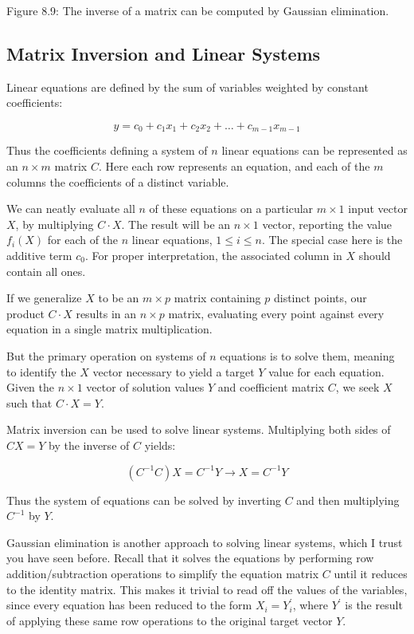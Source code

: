 \documentclass[10pt]{article}
\begin{document}
Figure 8.9: The inverse of a matrix can be computed by Gaussian elimination.

\subsection*{Matrix Inversion and Linear Systems}
Linear equations are defined by the sum of variables weighted by constant coefficients:

\[
y = c_{0} + c_{1} x_{1} + c_{2} x_{2} + \ldots + c_{m-1} x_{m-1}
\]

Thus the coefficients defining a system of \(n\) linear equations can be represented as an \(n \times m\) matrix \(C\). Here each row represents an equation, and each of the \(m\) columns the coefficients of a distinct variable.

We can neatly evaluate all \(n\) of these equations on a particular \(m \times 1\) input vector \(X\), by multiplying \(C \cdot X\). The result will be an \(n \times 1\) vector, reporting the value \(f_{i}(X)\) for each of the \(n\) linear equations, \(1 \leq i \leq n\). The special case here is the additive term \(c_{0}\). For proper interpretation, the associated column in \(X\) should contain all ones.

If we generalize \(X\) to be an \(m \times p\) matrix containing \(p\) distinct points, our product \(C \cdot X\) results in an \(n \times p\) matrix, evaluating every point against every equation in a single matrix multiplication.

But the primary operation on systems of \(n\) equations is to solve them, meaning to identify the \(X\) vector necessary to yield a target \(Y\) value for each equation. Given the \(n \times 1\) vector of solution values \(Y\) and coefficient matrix \(C\), we seek \(X\) such that \(C \cdot X = Y\).

Matrix inversion can be used to solve linear systems. Multiplying both sides of \(CX = Y\) by the inverse of \(C\) yields:

\[
(C^{-1} C) X = C^{-1} Y \rightarrow X = C^{-1} Y
\]

Thus the system of equations can be solved by inverting \(C\) and then multiplying \(C^{-1}\) by \(Y\).

Gaussian elimination is another approach to solving linear systems, which I trust you have seen before. Recall that it solves the equations by performing row addition/subtraction operations to simplify the equation matrix \(C\) until it reduces to the identity matrix. This makes it trivial to read off the values of the variables, since every equation has been reduced to the form \(X_{i} = Y_{i}^{\prime}\), where \(Y^{\prime}\) is the result of applying these same row operations to the original target vector \(Y\).
\end{document}
